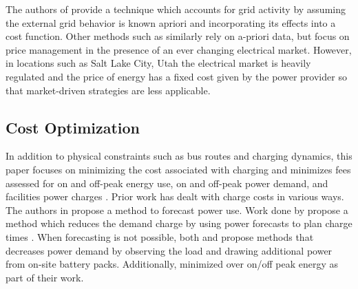 \par The authors of \cite{jahic_preemptive_2019} provide a technique which accounts for grid activity by assuming the external grid behavior is known apriori and incorporating its effects into a cost function. Other methods such as \cite{Corinaldesi_2020} similarly rely on a-priori data, but focus on price management in the presence of an ever changing electrical market.  However, in locations such as Salt Lake City, Utah the electrical market is heavily regulated and the price of energy has a fixed cost given by the power provider so that market-driven strategies are less applicable.
\subsection{Cost Optimization}
In addition to physical constraints such as bus routes and charging dynamics, this paper focuses on minimizing the cost associated with charging and minimizes fees assessed for on and off-peak energy use, on and off-peak power demand, and facilities power charges \cite{noauthor_rocky_nodate}. Prior work has dealt with charge costs in various ways.  
The authors in \cite{gao_charging_2019} propose a method to forecast power use. Work done by \cite{qin_numerical_2016} propose a method which reduces the demand charge by using power forecasts to plan charge times \cite{gao_charging_2019}.  When forecasting is not possible, both \cite{ojer_development_2020} and \cite{cheng_smart_2020} propose methods that decreases power demand by observing the load and drawing additional power from on-site battery packs. Additionally, \cite{el-taweel_incorporation_2019} minimized over on/off peak energy as part of their work.  

